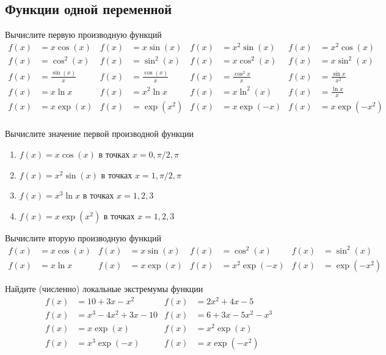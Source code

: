 
\subsection{Функции одной переменной}

\begin{exercise}
Вычислите первую производную функций
\begin{align*}
	f(x)&=x\cos(x) & f(x)&=x\sin(x) & f(x)&=x^2\sin(x) & f(x)&=x^2\cos(x) \\
	f(x)&=\cos^2(x) & f(x)&=\sin^2(x) & f(x)&=x\cos^2(x) & f(x)&=x\sin^2(x) \\
	f(x)&=\frac{\sin(x)}{x} & f(x)&=\frac{\cos(x)}{x} & f(x)&=\frac{\cos^2{x}}{x} & f(x)&=\frac{\sin{x}}{x^2} \\
	f(x)&=x\ln x & f(x)&=x^2\ln x & f(x)&=x\ln^2(x) & f(x)&=\frac{\ln x}{x} \\
	f(x)&=x\exp(x) & f(x)&=\exp(x^2) & f(x)&=x\exp(-x) & f(x)&=x\exp(-x^2) \\
\end{align*}
\end{exercise}

\begin{exercise}
Вычислите значение первой производной функции
\begin{enumerate}
	\item \(f(x)=x\cos(x)\) в точках \(x=0, \pi/2, \pi\)
	\item \(f(x)=x^2\sin(x)\) в точках \(x=1, \pi/2, \pi\)
	\item \(f(x)=x^3\ln x\) в точках \(x=1, 2, 3\)
	\item \(f(x)=x\exp(x^2)\) в точках \(x=1, 2, 3\)
\end{enumerate}
\end{exercise}

\begin{exercise}
Вычислите вторую производную функций
\begin{align*}
	f(x)&=x\cos(x) & f(x)&=x\sin(x) & f(x)&=\cos^2(x) & f(x)&=\sin^2(x) \\
	f(x)&=x\ln x & f(x)&=x\exp(x) & f(x)&=x^2\exp(-x) & f(x)&=\exp(-x^2)
\end{align*}
\end{exercise}

\begin{exercise}
Найдите (численно) локальные экстремумы функции 
\begin{align*}
	f(x)&=10+3x-x^2 & f(x)&=2x^2+4x-5 \\
	f(x)&=x^3-4x^2+3x-10 & f(x)&=6+3x-5x^2-x^3 \\
	f(x)&=x\exp(x) & f(x)&=x^2\exp(x) \\
	f(x)&=x^3\exp(-x) & f(x)&=x\exp(-x^2) 
\end{align*}
\end{exercise}

